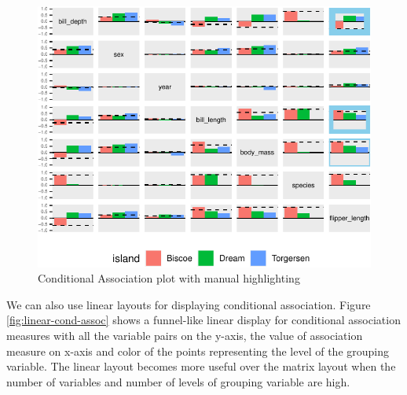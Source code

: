 \begin{Schunk}
\begin{figure}

{\centering \includegraphics{rj_paper_files/figure-latex/cond-assoc-manual-1} 

}

\caption[Conditional Association plot with manual highlighting]{Conditional Association plot with manual highlighting}\label{fig:cond-assoc-manual}
\end{figure}
\end{Schunk}

We can also use linear layouts for displaying conditional association.
Figure \ref{fig:linear-cond-assoc} shows a funnel-like linear display
for conditional association measures with all the variable pairs on the
y-axis, the value of association measure on x-axis and color of the
points representing the level of the grouping variable. The linear
layout becomes more useful over the matrix layout when the number of
variables and number of levels of grouping variable are high.

